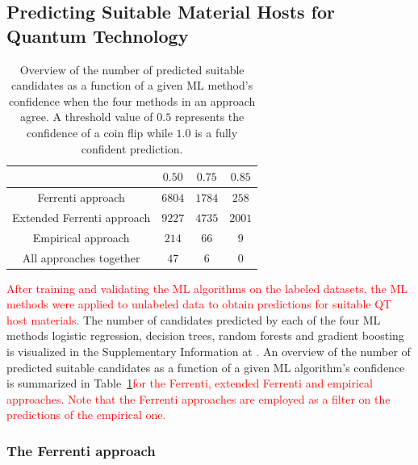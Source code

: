 \documentclass[superscriptaddress,unsortedaddress,
 amsmath,amssymb,
 aps,
]{revtex4-2}
\newcommand{\mrk}[1]{\textcolor{red}{#1}}
\begin{document}
\subsection*{Predicting Suitable Material Hosts for Quantum Technology} 

\begin{table}[b]
    \centering 
    \caption{Overview of the number of predicted suitable candidates as a function of a given ML method's confidence when the four methods in an approach agree. A threshold value of $0.5$ represents the confidence of a coin flip while $1.0$ is a fully confident prediction.}
    \begin{tabular}{c|c|c|c}
      & $0.50$ & $0.75$ & $0.85$ \\
     \hline
     Ferrenti approach &  $6804$ & $1784$ & $258$  \\
     Extended Ferrenti approach &  $9227$ & $4735$  & $2001$  \\ 
     Empirical approach & $214$ & $66$ & $9$ \\
     \hline
     All approaches together & $47$ & $6$ & 0 \\
    \end{tabular}
    \label{tab:probabilites}
\end{table} 


\mrk{After training and validating the ML algorithms on the labeled datasets, the ML methods were applied to unlabeled data to obtain predictions for suitable QT host materials.} 
The number of candidates predicted by each of the four ML methods logistic regression, decision trees, random forests and gradient boosting is visualized in the Supplementary Information at \cite{supplementary}\mrk{.} %
An overview of the number of predicted suitable candidates as a function of a given ML algorithm's confidence is summarized in Table~\ref{tab:probabilites}\mrk{for the Ferrenti, extended Ferrenti and empirical approaches. Note that the Ferrenti approaches are employed as a filter on the predictions of the empirical one.} 

\subsubsection*{The Ferrenti approach}
\end{document}
